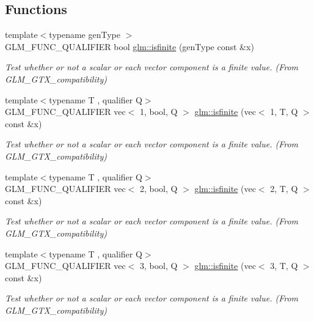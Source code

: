 \subsection*{Functions}
\begin{DoxyCompactItemize}
\item 
{\footnotesize template$<$typename gen\+Type $>$ }\\G\+L\+M\+\_\+\+F\+U\+N\+C\+\_\+\+Q\+U\+A\+L\+I\+F\+I\+ER bool \hyperlink{group__gtx__compatibility_gaf4b04dcd3526996d68c1bfe17bfc8657}{glm\+::isfinite} (gen\+Type const \&x)
\begin{DoxyCompactList}\small\item\em Test whether or not a scalar or each vector component is a finite value. (From G\+L\+M\+\_\+\+G\+T\+X\+\_\+compatibility) \end{DoxyCompactList}\item 
{\footnotesize template$<$typename T , qualifier Q$>$ }\\G\+L\+M\+\_\+\+F\+U\+N\+C\+\_\+\+Q\+U\+A\+L\+I\+F\+I\+ER vec$<$ 1, bool, Q $>$ \hyperlink{group__gtx__compatibility_gac3b12b8ac3014418fe53c299478b6603}{glm\+::isfinite} (vec$<$ 1, T, Q $>$ const \&x)
\begin{DoxyCompactList}\small\item\em Test whether or not a scalar or each vector component is a finite value. (From G\+L\+M\+\_\+\+G\+T\+X\+\_\+compatibility) \end{DoxyCompactList}\item 
{\footnotesize template$<$typename T , qualifier Q$>$ }\\G\+L\+M\+\_\+\+F\+U\+N\+C\+\_\+\+Q\+U\+A\+L\+I\+F\+I\+ER vec$<$ 2, bool, Q $>$ \hyperlink{group__gtx__compatibility_ga8e76dc3e406ce6a4155c2b12a2e4b084}{glm\+::isfinite} (vec$<$ 2, T, Q $>$ const \&x)
\begin{DoxyCompactList}\small\item\em Test whether or not a scalar or each vector component is a finite value. (From G\+L\+M\+\_\+\+G\+T\+X\+\_\+compatibility) \end{DoxyCompactList}\item 
{\footnotesize template$<$typename T , qualifier Q$>$ }\\G\+L\+M\+\_\+\+F\+U\+N\+C\+\_\+\+Q\+U\+A\+L\+I\+F\+I\+ER vec$<$ 3, bool, Q $>$ \hyperlink{group__gtx__compatibility_ga929ef27f896d902c1771a2e5e150fc97}{glm\+::isfinite} (vec$<$ 3, T, Q $>$ const \&x)
\begin{DoxyCompactList}\small\item\em Test whether or not a scalar or each vector component is a finite value. (From G\+L\+M\+\_\+\+G\+T\+X\+\_\+compatibility) \end{DoxyCompactList}\item 

\end{DoxyCompactItemize}
